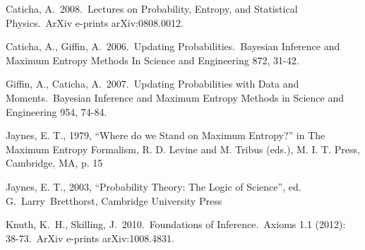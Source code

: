 \documentclass[a4paper, 11pt]{article}
\begin{document}
\begin{thebibliography}{}
 Caticha, A.\ 2008.\ Lectures 
on Probability, Entropy, and Statistical Physics.\ ArXiv e-prints 
arXiv:0808.0012. 

 Caticha, A., 
Giffin, A.\ 2006.\ Updating Probabilities.\ Bayesian Inference and Maximum 
Entropy Methods In Science and Engineering 872, 31-42.

 Giffin, A., 
Caticha, A.\ 2007.\ Updating Probabilities with Data and Moments.\ Bayesian 
Inference and Maximum Entropy Methods in Science and Engineering 954, 
74-84.

 Jaynes, E. T., 1979, ``Where do we Stand on Maximum Entropy?'' in The Maximum Entropy Formalism, R. D. Levine and M. Tribus (eds.), M. I. T. Press, Cambridge, MA, p. 15

 Jaynes, E. T., 2003, ``Probability Theory:
The Logic of Science'', ed. G.~Larry~Bretthorst, Cambridge University Press

 Knuth, K.~H., 
Skilling, J.\ 2010.\ Foundations of Inference.\
Axioms 1.1 (2012): 38-73.\
ArXiv e-prints arXiv:1008.4831. 
\end{thebibliography}
\end{document}
